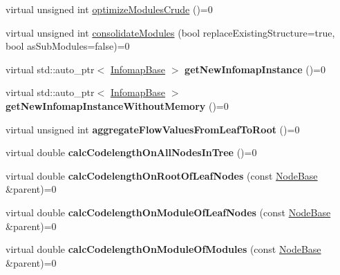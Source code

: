 \begin{DoxyCompactItemize}
\item 
virtual unsigned int \mbox{\hyperlink{classInfomapBase_acb6dc935567c31d7ada4b514c5b8dcea}{optimize\+Modules\+Crude}} ()=0
\item 
virtual unsigned int \mbox{\hyperlink{classInfomapBase_ac6da8d87eb4d0760157367e8fcdfbdbc}{consolidate\+Modules}} (bool replace\+Existing\+Structure=true, bool as\+Sub\+Modules=false)=0
\item 
\mbox{\label{classInfomapBase_aef66fda5744eda6c2db64d206ddba443}} 
virtual std\+::auto\+\_\+ptr$<$ \mbox{\hyperlink{classInfomapBase}{Infomap\+Base}} $>$ {\bfseries get\+New\+Infomap\+Instance} ()=0
\item 
\mbox{\label{classInfomapBase_a6c47213c7fb80fed3ee0febf213d0a3c}} 
virtual std\+::auto\+\_\+ptr$<$ \mbox{\hyperlink{classInfomapBase}{Infomap\+Base}} $>$ {\bfseries get\+New\+Infomap\+Instance\+Without\+Memory} ()=0
\item 
\mbox{\label{classInfomapBase_ac67bce625b5f6da820370dae7b53bb7c}} 
virtual unsigned int {\bfseries aggregate\+Flow\+Values\+From\+Leaf\+To\+Root} ()=0
\item 
\mbox{\label{classInfomapBase_ad6576086118043dddb163b5ffc4cf1aa}} 
virtual double {\bfseries calc\+Codelength\+On\+All\+Nodes\+In\+Tree} ()=0
\item 
\mbox{\label{classInfomapBase_adf5f5156407a7708249806154eb74bf2}} 
virtual double {\bfseries calc\+Codelength\+On\+Root\+Of\+Leaf\+Nodes} (const \mbox{\hyperlink{classNodeBase}{Node\+Base}} \&parent)=0
\item 
\mbox{\label{classInfomapBase_a9f45c822cf479e4cf069292099c4c077}} 
virtual double {\bfseries calc\+Codelength\+On\+Module\+Of\+Leaf\+Nodes} (const \mbox{\hyperlink{classNodeBase}{Node\+Base}} \&parent)=0
\item 
\mbox{\label{classInfomapBase_afa3e083c4db38ae0f282c5344e627eb7}} 
virtual double {\bfseries calc\+Codelength\+On\+Module\+Of\+Modules} (const \mbox{\hyperlink{classNodeBase}{Node\+Base}} \&parent)=0
\item 
\mbox{\label{classInfomapBase_a62771f3d70b84e7d69f20d5ddce50c6d}} 

\end{DoxyCompactItemize}
